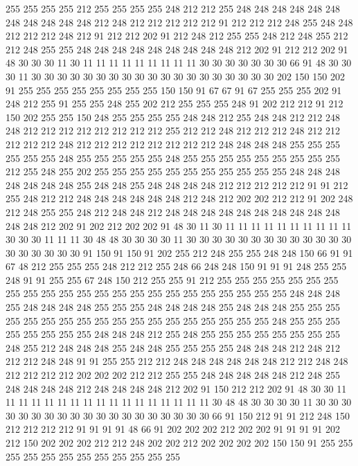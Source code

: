255 255 255 255 212 255 255 255 255 248 212 212 255 248 248 248 248 248 248 248
248 248 248 248 212 248 212 212 212 212 212 91 212 212 212 248 255 248 248 212
212 212 248 212 91 212 212 202 91 212 248 212 255 255 248 212 248 255 212 212
248 255 255 248 248 248 248 248 248 248 248 248 212 202 91 212 212 202 91 48
30 30 30 11 30 11 11 11 11 11 11 11 11 11 30 30 30 30 30 30
30 66 91 48 30 30 30 11 30 30 30 30 30 30 30 30 30 30 30 30
30 30 30 30 30 30 30 202 150 150 202 91 255 255 255 255 255 255 255 255
150 150 91 67 67 91 67 255 255 255 202 91 248 212 255 91 255 255 248 255
202 212 255 255 255 248 91 202 212 212 91 212 150 202 255 255 150 248 255 255
255 255 248 248 212 255 248 248 212 212 248 248 212 212 212 212 212 212 212 212
255 212 212 248 212 212 212 248 212 212 212 212 212 248 212 212 212 212 212 212
212 212 248 248 248 248 255 255 255 255 255 255 248 255 255 255 255 255 248 255
255 255 255 255 255 255 255 255 212 255 248 255 202 255 255 255 255 255 255 255
255 255 255 255 248 248 248 248 248 248 248 255 248 248 255 248 248 248 248 212
212 212 212 212 91 91 212 255 248 212 212 248 248 248 248 248 248 212 248 212
202 202 212 212 91 202 248 212 248 255 255 248 212 248 248 212 248 248 248 248
248 248 248 248 248 248 248 248 212 202 91 202 212 202 202 91 48 30 11 30
11 11 11 11 11 11 11 11 11 11 30 30 30 11 11 11 30 48 48 30
30 30 30 11 30 30 30 30 30 30 30 30 30 30 30 30 30 30 30 30
30 30 30 91 150 91 150 91 202 255 212 248 255 255 248 248 150 66 91 91
67 48 212 255 255 255 248 212 212 255 248 66 248 248 150 91 91 91 248 255
255 248 91 91 255 255 67 248 150 212 255 255 91 212 255 255 255 255 255 255
255 255 255 255 255 255 255 255 255 255 255 255 255 255 255 255 255 248 248 248
255 248 248 248 248 255 255 255 248 248 248 248 255 248 248 248 255 255 255 255
255 255 255 255 255 255 255 255 255 255 255 255 255 255 248 255 255 255 255 255
255 255 255 248 248 248 212 255 248 255 255 255 255 255 255 255 255 248 255 212
248 248 248 255 248 248 255 255 255 255 248 248 248 212 248 212 212 212 248 248
91 91 255 255 212 212 248 248 248 248 248 248 212 212 248 248 212 212 212 212
202 202 202 212 212 255 255 248 248 248 248 248 212 248 255 248 248 248 248 212
248 248 248 248 212 202 91 150 212 212 202 91 48 30 30 11 11 11 11 11
11 11 11 11 11 11 11 11 11 11 11 11 30 48 48 30 30 30 30 11
30 30 30 30 30 30 30 30 30 30 30 30 30 30 30 30 30 30 30 66
91 150 212 91 91 212 248 150 212 212 212 212 91 91 91 91 48 66 91 202
202 202 212 202 202 91 91 91 91 202 212 150 202 202 202 212 212 248 202 202
212 202 202 202 202 150 150 91 255 255 255 255 255 255 255 255 255 255 255 255
